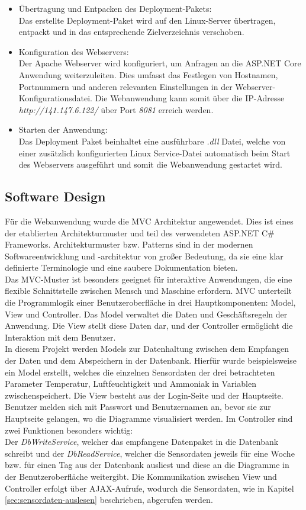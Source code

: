 \documentclass[conference]{IEEEtran}
\begin{document}
\begin{itemize}
	\item Übertragung und Entpacken des Deployment-Pakets: \\
	Das erstellte Deployment-Paket wird auf den Linux-Server übertragen, entpackt und in das entsprechende Zielverzeichnis verschoben.
	\item Konfiguration des Webservers: \\
	Der Apache Webserver wird konfiguriert, um Anfragen an die ASP.NET Core Anwendung weiterzuleiten. Dies umfasst das Festlegen von Hostnamen, Portnummern und anderen relevanten Einstellungen in der Webserver-Konfigurationsdatei. Die Webanwendung kann somit über die IP-Adresse \textit{http://141.147.6.122/} über Port \textit{8081} erreich werden.
	\item Starten der Anwendung: \\
	Das Deployment Paket beinhaltet eine ausführbare \textit{.dll} Datei, welche von einer zusätzlich konfigurierten Linux Service-Datei automatisch beim Start des Webservers ausgeführt und somit die Webanwendung gestartet wird.
\end{itemize}
\subsection{Software Design}
Für die Webanwendung wurde die MVC Architektur angewendet. Dies ist eines der etablierten Architekturmuster und teil des verwendeten ASP.NET C\# Frameworks. Architekturmuster bzw. Patterns sind in der modernen Softwareentwicklung und -architektur von großer Bedeutung, da sie eine klar definierte Terminologie und eine saubere Dokumentation bieten.  \\
Das MVC-Muster ist besonders geeignet für interaktive Anwendungen, die eine flexible Schnittstelle zwischen Mensch und Maschine erfordern. MVC unterteilt die Programmlogik einer Benutzeroberfläche in drei Hauptkomponenten: Model, View und Controller. Das Model verwaltet die Daten und Geschäftsregeln der Anwendung. Die View stellt diese Daten dar, und der Controller ermöglicht die Interaktion mit dem Benutzer. \cite{mvc} \\
In diesem Projekt werden Models zur Datenhaltung zwischen dem Empfangen der Daten und dem Abspeichern in der Datenbank. Hierfür wurde beispielsweise ein Model  erstellt, welches die einzelnen Sensordaten der drei betrachteten Parameter Temperatur, Luftfeuchtigkeit und Ammoniak in Variablen zwischenspeichert. Die View besteht aus der Login-Seite und der Hauptseite. Benutzer melden sich mit Passwort und Benutzernamen an, bevor sie zur Hauptseite gelangen, wo die Diagramme visualisiert werden. Im Controller sind zwei Funktionen besonders wichtig: \\
Der \textit{DbWriteService}, welcher das empfangene Datenpaket in die Datenbank schreibt und der \textit{DbReadService}, welcher die Sensordaten jeweils für eine Woche bzw. für einen Tag aus der Datenbank ausliest und diese an die Diagramme in der Benutzeroberfläche weitergibt. Die Kommunikation zwischen View und Controller erfolgt über AJAX-Aufrufe, wodurch die Sensordaten, wie in Kapitel \ref{sec:sensordaten-auslesen} beschrieben, abgerufen werden.
\newpage
\end{document}
